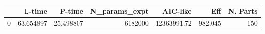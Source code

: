 \begin{tabular}{lrrrrrr}
\toprule
{} &     L-time &     P-time &  N\_params\_expt &     AIC-like &      Eff &  N. Parts \\
\midrule
0 &  63.654897 &  25.498807 &        6182000 &  12363991.72 &  982.045 &       150 \\
\bottomrule
\end{tabular}
